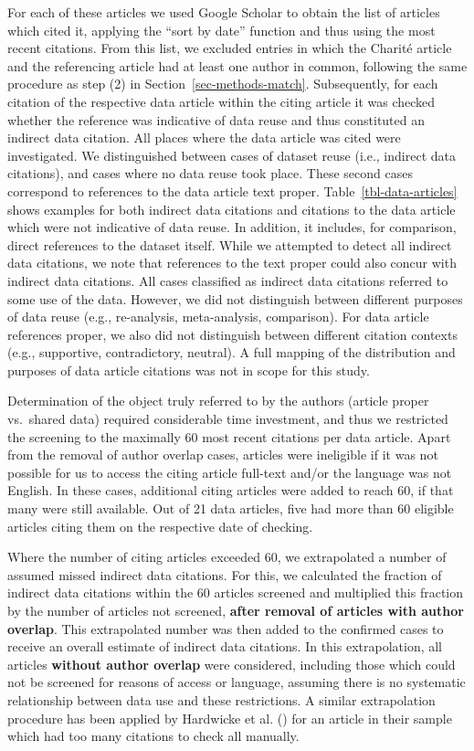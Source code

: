 \documentclass[
  letterpaper,
  DIV=11,
  numbers=noendperiod]{scrartcl}
\begin{document}
For each of these articles we used Google Scholar to obtain the list of
articles which cited it, applying the ``sort by date'' function and thus
using the most recent citations. From this list, we excluded entries in
which the Charité article and the referencing article had at least one
author in common, following the same procedure as step (2) in
Section~\ref{sec-methods-match}. Subsequently, for each citation of the
respective data article within the citing article it was checked whether
the reference was indicative of data reuse and thus constituted an
indirect data citation. All places where the data article was cited were
investigated. We distinguished between cases of dataset reuse (i.e.,
indirect data citations), and cases where no data reuse took place.
These second cases correspond to references to the data article text
proper. Table~\ref{tbl-data-articles} shows examples for both indirect
data citations and citations to the data article which were not
indicative of data reuse. In addition, it includes, for comparison,
direct references to the dataset itself. While we attempted to detect
all indirect data citations, we note that references to the text proper
could also concur with indirect data citations. All cases classified as
indirect data citations referred to some use of the data. However, we
did not distinguish between different purposes of data reuse (e.g.,
re-analysis, meta-analysis, comparison). For data article references
proper, we also did not distinguish between different citation contexts
(e.g., supportive, contradictory, neutral). A full mapping of the
distribution and purposes of data article citations was not in scope for
this study.

Determination of the object truly referred to by the authors (article
proper vs.~shared data) required considerable time investment, and thus
we restricted the screening to the maximally 60 most recent citations
per data article. Apart from the removal of author overlap cases,
articles were ineligible if it was not possible for us to access the
citing article full-text and/or the language was not English. In these
cases, additional citing articles were added to reach 60, if that many
were still available. Out of 21 data articles, five had more than 60
eligible articles citing them on the respective date of checking.

Where the number of citing articles exceeded 60, we extrapolated a
number of assumed missed indirect data citations. For this, we
calculated the fraction of indirect data citations within the 60
articles screened and multiplied this fraction by the number of articles
not screened, \textbf{after removal of articles with author overlap}.
This extrapolated number was then added to the confirmed cases to
receive an overall estimate of indirect data citations. In this
extrapolation, all articles \textbf{without author overlap} were
considered, including those which could not be screened for reasons of
access or language, assuming there is no systematic relationship between
data use and these restrictions. A similar extrapolation procedure has
been applied by Hardwicke et al.
() for an
article in their sample which had too many citations to check all
manually.
\end{document}
